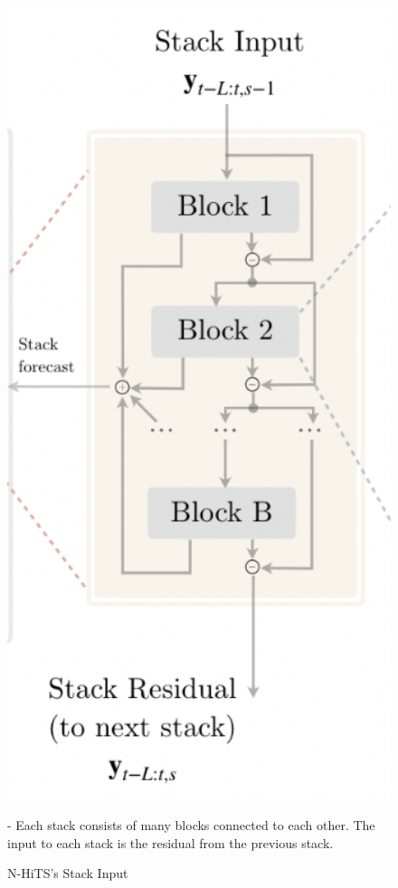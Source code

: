 \documentclass{ieeeojies}
\begin{document}
\begin{figure}[H]
    \centering
    \begin{minipage}{0.15\textwidth}
    \centering
    \includegraphics[width=1\textwidth]{N-HiTS Stack Input.png}
    \caption{N-HiTS’s Stack Input}
    \label{fig:1}
    \end{minipage}
    \begin{minipage}{0.50\textwidth}
    - Each stack consists of many blocks connected to each other. The input to each stack is the residual from the previous stack.
    \end{minipage}
\end{figure}
\end{document}
